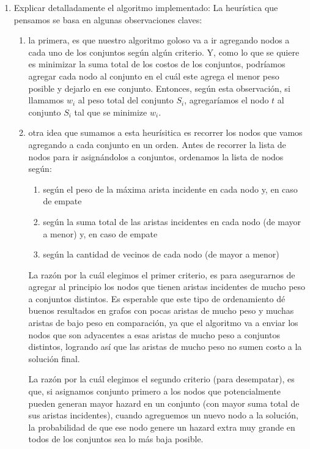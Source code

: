 \documentclass[11pt, a4paper, twoside]{article}
\begin{document}
    \begin{enumerate}
		\item Explicar detalladamente el algoritmo implementado:
		La heurística que pensamos se basa en algunas observaciones claves: 
		\begin{enumerate}
			\item la primera, es que nuestro
			algoritmo goloso va a ir agregando nodos a cada uno de los conjuntos según algún criterio. Y,
			como lo que se quiere es minimizar la suma total de los costos de los conjuntos, podríamos agregar
			cada nodo al conjunto en el cuál este agrega el menor peso posible y dejarlo en ese conjunto. 
			Entonces, según esta observación,
			si llamamos $w_{i}$ al peso total del conjunto $S_{i}$, 
			agregaríamos el nodo $t$ al conjunto $S_{i}$ tal que se minimize $w_{i}$.
						
			\item otra idea que sumamos a esta heurísitica es recorrer los nodos que vamos agregando a
			cada conjunto en un orden. Antes de recorrer la lista de nodos para ir asignándolos a conjuntos,
			ordenamos la lista de nodos según: 
			\begin{enumerate}
				\item según el peso de la máxima arista incidente en cada nodo y, en caso de empate
				\item según la suma total de las aristas incidentes en cada nodo (de mayor a menor) y, en caso de empate
				\item según la cantidad de vecinos de cada nodo (de mayor a menor)
			\end{enumerate}
			La razón por la cuál elegimos el primer criterio, es para asegurarnos de agregar al principio los nodos
			que tienen aristas incidentes de mucho peso a conjuntos distintos.
			Es esperable que este tipo de ordenamiento dé buenos resultados en grafos con pocas aristas de mucho
			peso y muchas aristas de bajo peso en comparación, ya que el algoritmo va a enviar los nodos 
			que son adyacentes a esas aristas de mucho peso a conjuntos distintos, logrando así que las aristas de
			mucho peso no sumen costo a la solución final.
			
			La razón por la cuál elegimos el segundo criterio (para desempatar), es que, si asignamos conjunto
			primero a los nodos que potencialmente pueden generan mayor hazard en un conjunto (con mayor suma total de sus 
			aristas incidentes), cuando
			agreguemos un nuevo nodo a la solución, la probabilidad de que ese nodo genere un hazard extra muy grande en todos
			de los conjuntos sea lo más baja posible.
			

\end{enumerate}
\end{enumerate}
\end{document}
